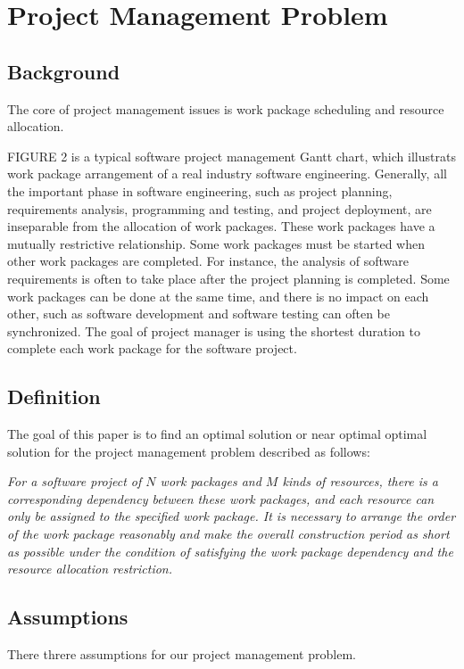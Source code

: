 
\section{Project Management Problem}
%
\subsection{Background}
%
The core of project management issues is work package scheduling and resource allocation.


FIGURE 2 is a typical software project management Gantt chart,
which illustrats work package arrangement of a real industry software engineering.
Generally, all the important phase in software engineering,
such as project planning, requirements analysis, programming and testing, and project deployment,
are inseparable from the allocation of work packages.
These work packages have a mutually restrictive relationship.
Some work packages must be started when other work packages are completed.
For instance, the analysis of software requirements is often to take place after the project planning is completed.
Some work packages can be done at the same time, and there is no impact on each other,
such as software development and software testing can often be synchronized.
The goal of project manager is using the shortest duration to complete each work package for the software project.


\subsection{Definition}
%
The goal of this paper is to find an optimal solution or near optimal optimal solution
for the project management problem described as follows:

\emph{
  For a software project of $N$ work packages and $M$ kinds of resources,
  there is a corresponding dependency between these work packages,
  and each resource can only be assigned to the specified work package.
  It is necessary to arrange the order of the work package reasonably
  and make the overall construction period as short as possible under
  the condition of satisfying the work package dependency and the resource allocation restriction.
}


\subsection{Assumptions}
%
There threre assumptions for our project management problem.

